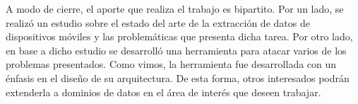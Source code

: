 A modo de cierre, el aporte que realiza el trabajo es bipartito. Por un lado, se realizó un estudio sobre el estado del arte de la extracción de datos de dispositivos móviles y las problemáticas que presenta dicha tarea. Por otro lado, en base a dicho estudio se desarrolló una herramienta para atacar varios de los problemas presentados. Como vimos, la herramienta fue desarrollada con un énfasis en el diseño de su arquitectura. De esta forma, otros interesados podrán extenderla a dominios de datos en el área de interés que deseen trabajar.
